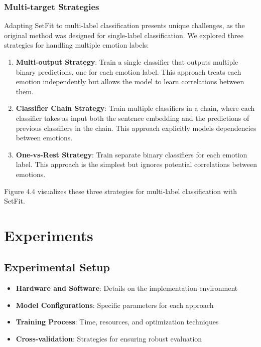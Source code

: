 \documentclass[a4paper,12pt]{extarticle}
\begin{document}
\subsubsection{Multi-target Strategies}

Adapting SetFit to multi-label classification presents unique challenges, as the original method was designed for single-label classification. We explored three strategies for handling multiple emotion labels:

\begin{enumerate}
\item \textbf{Multi-output Strategy}: Train a single classifier that outputs multiple binary predictions, one for each emotion label. This approach treats each emotion independently but allows the model to learn correlations between them.

\item \textbf{Classifier Chain Strategy}: Train multiple classifiers in a chain, where each classifier takes as input both the sentence embedding and the predictions of previous classifiers in the chain. This approach explicitly models dependencies between emotions.

\item \textbf{One-vs-Rest Strategy}: Train separate binary classifiers for each emotion label. This approach is the simplest but ignores potential correlations between emotions.
\end{enumerate}

Figure 4.4 visualizes these three strategies for multi-label classification with SetFit.

\section{Experiments}

\subsection{Experimental Setup}
\begin{itemize}
\item \textbf{Hardware and Software}: Details on the implementation environment
\item \textbf{Model Configurations}: Specific parameters for each approach
\item \textbf{Training Process}: Time, resources, and optimization techniques
\item \textbf{Cross-validation}: Strategies for ensuring robust evaluation
\end{itemize}
\end{document}
